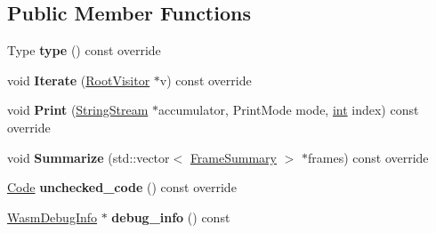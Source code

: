 \subsection*{Public Member Functions}
\begin{DoxyCompactItemize}
\item 
\mbox{\label{classv8_1_1internal_1_1WasmInterpreterEntryFrame_a7db66d2c1180dbd6c765e337ac8c5465}} 
Type {\bfseries type} () const override
\item 
\mbox{\label{classv8_1_1internal_1_1WasmInterpreterEntryFrame_abb209d120a5bbfe7a6cc8ff3610e70f2}} 
void {\bfseries Iterate} (\mbox{\hyperlink{classv8_1_1internal_1_1RootVisitor}{Root\+Visitor}} $\ast$v) const override
\item 
\mbox{\label{classv8_1_1internal_1_1WasmInterpreterEntryFrame_a27af350dceb7ba2910b260cdf6994838}} 
void {\bfseries Print} (\mbox{\hyperlink{classv8_1_1internal_1_1StringStream}{String\+Stream}} $\ast$accumulator, Print\+Mode mode, \mbox{\hyperlink{classint}{int}} index) const override
\item 
\mbox{\label{classv8_1_1internal_1_1WasmInterpreterEntryFrame_a44b9911b6dc31e469936837f1fdf0236}} 
void {\bfseries Summarize} (std\+::vector$<$ \mbox{\hyperlink{classv8_1_1internal_1_1FrameSummary}{Frame\+Summary}} $>$ $\ast$frames) const override
\item 
\mbox{\label{classv8_1_1internal_1_1WasmInterpreterEntryFrame_a5fcaec402417add19a475a989c557f48}} 
\mbox{\hyperlink{classv8_1_1internal_1_1Code}{Code}} {\bfseries unchecked\+\_\+code} () const override
\item 
\mbox{\label{classv8_1_1internal_1_1WasmInterpreterEntryFrame_aa9b2f2ffedd062d8547a9db0da9fbf89}} 
\mbox{\hyperlink{classv8_1_1internal_1_1WasmDebugInfo}{Wasm\+Debug\+Info}} $\ast$ {\bfseries debug\+\_\+info} () const
\item 
\mbox{\label{classv8_1_1internal_1_1WasmInterpreterEntryFrame_a7df70fe944f7b4d8a52f89fa3101585a}} 

\end{DoxyCompactItemize}

